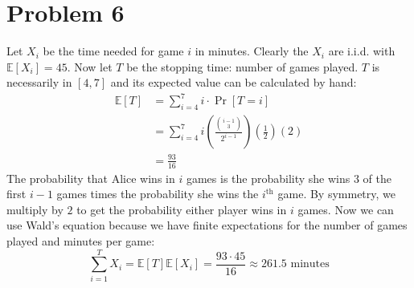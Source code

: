 \documentclass[11pt]{article}
\newcommand{\E}{\mathbb{E}}
\newcommand{\asdf}{\newline\newline}
\begin{document}
\section*{Problem 6}
Let $X_i$ be the time needed for game $i$ in minutes. Clearly the $X_i$ are i.i.d. with $\E[X_i]=45$. Now let $T$ be the stopping time: number of games played. $T$ is necessarily in $[4,7]$ and its expected value can be calculated by hand:
\begin{align*}
\E[T] &= \sum_{i=4}^7 i\cdot\Pr[T=i]\\
&= \sum_{i=4}^7 i\left(\frac{{i-1 \choose 3}}{2^{i-1}}\right)\left(\frac12\right)(2)\\
&= \frac{93}{16}
\end{align*}
The probability that Alice wins in $i$ games is the probability she wins $3$ of the first $i-1$ games times the probability she wins the $i^{\text{th}}$ game. By symmetry, we multiply by $2$ to get the probability either player wins in $i$ games.\asdf
Now we can use Wald's equation because we have finite expectations for the number of games played and minutes per game:
$$\sum_{i=1}^TX_i=\E[T]\E[X_i]=\frac{93\cdot45}{16}\approx 261.5\text{ minutes}$$
\end{document}
